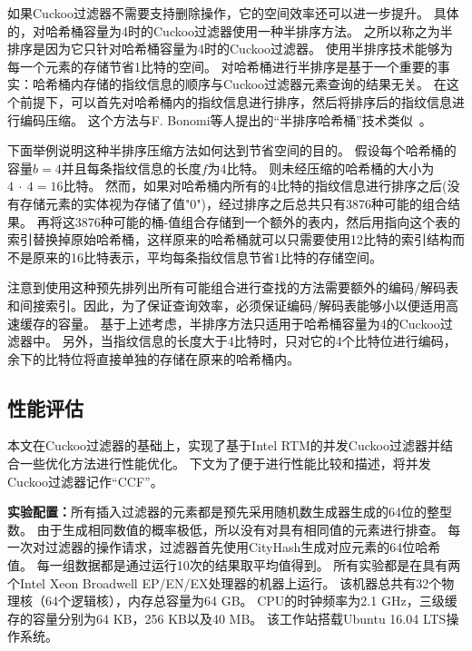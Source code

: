 如果Cuckoo过滤器不需要支持删除操作，它的空间效率还可以进一步提升。
具体的，对哈希桶容量为4时的Cuckoo过滤器使用一种半排序方法。
之所以称之为半排序是因为它只针对哈希桶容量为4时的Cuckoo过滤器。
使用半排序技术能够为每一个元素的存储节省1比特的空间。
对哈希桶进行半排序是基于一个重要的事实：哈希桶内存储的指纹信息的顺序与Cuckoo过滤器元素查询的结果无关。
在这个前提下，可以首先对哈希桶内的指纹信息进行排序，然后将排序后的指纹信息进行编码压缩。
这个方法与F. Bonomi等人提出的“半排序哈希桶”技术类似~\cite{bonomi2006improved}。

下面举例说明这种半排序压缩方法如何达到节省空间的目的。
假设每个哈希桶的容量$b = 4$并且每条指纹信息的长度$f$为4比特。
则未经压缩的哈希桶的大小为$4~\cdot~4 = 16$比特。
然而，如果对哈希桶内所有的4比特的指纹信息进行排序之后(没有存储元素的实体视为存储了值"0")，经过排序之后总共只有3876种可能的组合结果。
再将这3876种可能的桶-值组合存储到一个额外的表内，然后用指向这个表的索引替换掉原始哈希桶，这样原来的哈希桶就可以只需要使用12比特的索引结构而不是原来的16比特表示，平均每条指纹信息节省1比特的存储空间。

注意到使用这种预先排列出所有可能组合进行查找的方法需要额外的编码/解码表和间接索引。因此，为了保证查询效率，必须保证编码/解码表能够小以便适用高速缓存的容量。
基于上述考虑，半排序方法只适用于哈希桶容量为4的Cuckoo过滤器中。
另外，当指纹信息的长度大于4比特时，只对它的4个比特位进行编码，余下的比特位将直接单独的存储在原来的哈希桶内。

\subsection{性能评估}
本文在Cuckoo过滤器的基础上\cite{fan2014cuckoo}，实现了基于Intel RTM的并发Cuckoo过滤器并结合一些优化方法进行性能优化。
下文为了便于进行性能比较和描述，将并发Cuckoo过滤器记作“CCF”。

\textbf{实验配置：}所有插入过滤器的元素都是预先采用随机数生成器生成的64位的整型数。
由于生成相同数值的概率极低，所以没有对具有相同值的元素进行排查。
每一次对过滤器的操作请求，过滤器首先使用CityHash\cite{cityhash}生成对应元素的64位哈希值。
每一组数据都是通过运行10次的结果取平均值得到。
所有实验都是在具有两个Intel Xeon Broadwell EP/EN/EX处理器的机器上运行。
该机器总共有32个物理核（64个逻辑核），内存总容量为64 GB。
CPU的时钟频率为2.1 GHz，三级缓存的容量分别为64 KB，256 KB以及40 MB。
该工作站搭载Ubuntu 16.04 LTS操作系统。

